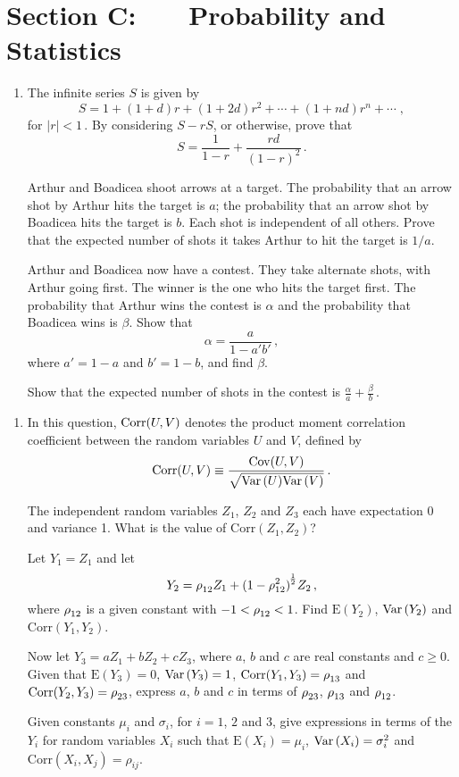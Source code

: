 \documentclass[a4, 11pt]{report}
\newlength{\qspace}
\newcounter{qnumber}
\newenvironment{question}%
 {\vspace{\qspace}
  \begin{enumerate}[\bfseries 1\quad][10]%
    \setcounter{enumi}{\value{qnumber}}%
    \item%
 }
{
  \end{enumerate}
  \filbreak
  \stepcounter{qnumber}
 }
\def\E{{\mathrm E}}
\def\ge{\geqslant}
\def\var{{\rm Var}\,}
\begin{document}
	
	\newpage
\section*{Section C: \ \ \ Probability and Statistics}


\begin{question}
The infinite series $S$ is given by
 \[
      S = 1 + (1 + d)r + (1 + 2d)r^2 + \cdots + (1+nd)r^n +\cdots\; 
,\]   
for $\vert r \vert <1\,$.
By considering $S - rS$, or otherwise, prove that 
\[
S = \frac 1{1-r} + \frac {rd}{(1-r)^2}
\,.\]

Arthur and Boadicea shoot arrows at a target. The probability that an
arrow shot by Arthur hits the target is $a$; the probability that an arrow
shot by Boadicea hits the target is $b$. Each shot is independent of all
others. Prove that the expected number of shots it takes Arthur to hit
the target is $1/a$.

Arthur and Boadicea now have a contest. They take alternate shots,
with Arthur going first. The winner is the one who hits the target first.
The probability
that Arthur wins the contest is  $\alpha$ and 
the probability that Boadicea wins is
$\beta$. Show that
\[
\alpha = \frac a {1-a'b'}\,,
\]
where $a' = 1-a$ and $b'=1-b$, and find $\beta$.
 

Show that the expected number of shots in the contest is
$\displaystyle \frac \alpha a + \frac \beta b\,.$
\end{question}

\begin{question}
In this question, ${\rm Corr}(U,V)$ denotes the product moment
correlation coefficient between the random variables
$U$ and $V$, defined by
\[
\mathrm{Corr}(U,V) \equiv \frac{\mathrm{Cov}(U,V)}{\sqrt{\var(U)\var(V)}}\,.
\]

The independent random variables $Z_1$, $Z_2$ and  $Z_3$
each have expectation 0
and variance 1. What is  the value of 
$\mathrm{Corr} (Z_1,Z_2)$?

Let $Y_1 = Z_1$ and let
\[
Y_2 = \rho^{\vphantom 2} _{12} Z_1 + 
(1 - {\rho_{12}^2)_{\vphantom A}}^{\! \frac12}  Z_ 2\,,
\]
where $\rho^{\vphantom 2}_{12}$ is a given constant with $-1<\rho^{\vphantom 2}
_{12}<1$.
Find $\E(Y_2)$, $\var(Y_2)$ and
$\mathrm{Corr}(Y_1, Y_2)$.

Now let $Y_3 =  aZ_1 + bZ_2 + cZ_3$, where $a$, $b$ and $c$ are real
constants and $c\ge0$. Given that 
$\E(Y_3) = 0$,  $\var(Y_3) = 1$, 
$ \mathrm{Corr}(Y_1, Y_3) 
=\rho^{{\vphantom 2}}_{13} 
$
and 
$ \mathrm{Corr}(Y_2, Y_3)= 
\rho^{\vphantom {2}} _{23}$, express
 $a$, $b$ and
$c$ in terms of $\rho^{\vphantom 2} _{23}$, $\rho^{\vphantom 2}_{13}$ 
and $\rho^{\vphantom 2} _{12}$.

Given constants $\mu_i$ and $\sigma_i$, for $i=1$, $2$ and $3$, give
 expressions in terms of the $Y_i$ for random variables $X_i$ 
such that
$\E(X_i) = \mu_i$, $\var(X_i) = \sigma_ i^2$ and 
$\mathrm{Corr}(X_i,X_j) = \rho_{ij}$.
\end{question}
\end{document}
